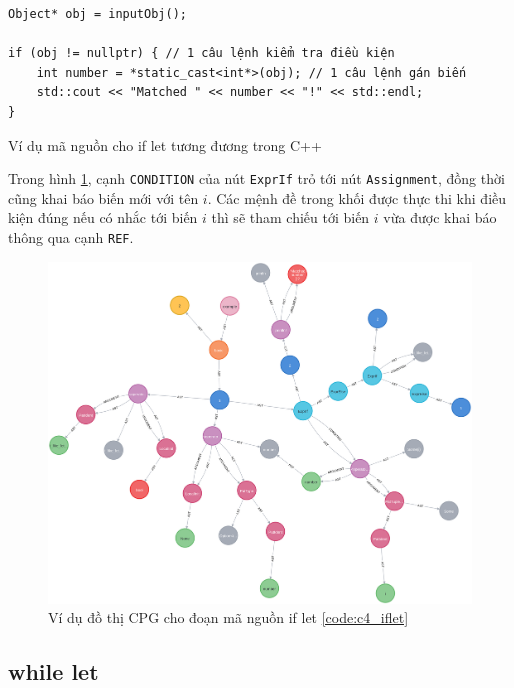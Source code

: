 \begin{listing}[H]
\begin{verbatim}
Object* obj = inputObj();

if (obj != nullptr) { // 1 câu lệnh kiểm tra điều kiện
    int number = *static_cast<int*>(obj); // 1 câu lệnh gán biến
    std::cout << "Matched " << number << "!" << std::endl;
}
\end{verbatim}
\caption{Ví dụ mã nguồn cho if let tương đương trong C++}
\label{code:c4_iflet_cpp}
\end{listing}

Trong hình \ref{img:c4_cpg_iflet}, cạnh \texttt{CONDITION} của nút \texttt{ExprIf} trỏ tới nút \texttt{Assignment}, đồng thời cũng khai báo biến mới với tên $i$.
Các mệnh đề trong khối được thực thi khi điều kiện đúng nếu có nhắc tới biến $i$ thì sẽ tham chiếu tới biến $i$ vừa được khai báo thông qua cạnh \texttt{REF}.

\begin{figure}[H]
\includegraphics[width=1\columnwidth]{figures/c4/c4_iflet.png}
\centering
\caption{Ví dụ đồ thị CPG cho đoạn mã nguồn if let \ref{code:c4_iflet}}
\label{img:c4_cpg_iflet}
\end{figure}

\subsection{while let}

